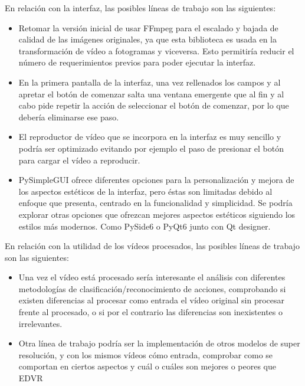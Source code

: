 En relación con la interfaz, las posibles líneas de trabajo son las siguientes:

\begin{itemize}
\item Retomar la versión inicial de usar FFmpeg para el escalado y bajada de calidad de las imágenes originales, ya que esta biblioteca es usada en la transformación de vídeo a fotogramas y viceversa. Esto permitiría reducir el número de requerimientos previos para poder ejecutar la interfaz. 

\item En la primera pantalla de la interfaz, una vez rellenados los campos y al apretar el botón de comenzar salta una ventana emergente que al fin y al cabo pide repetir la acción de seleccionar el botón de comenzar, por lo que debería eliminarse ese paso.

\item El reproductor de vídeo que se incorpora en la interfaz es muy sencillo y podría ser optimizado evitando por ejemplo el paso de presionar el botón para cargar el vídeo a reproducir.

\item PySimpleGUI ofrece diferentes opciones para la personalización y mejora de los aspectos estéticos de la interfaz, pero éstas son limitadas debido al enfoque que presenta, centrado en la funcionalidad y simplicidad. Se podría explorar otras opciones que ofrezcan mejores aspectos estéticos siguiendo los estilos más modernos. Como PySide6 o PyQt6 junto con Qt designer. 

\end{itemize}

En relación con la utilidad de los vídeos procesados, las posibles líneas de trabajo son las siguientes:

\begin{itemize}
\item Una vez el vídeo está procesado sería interesante el análisis con diferentes metodologías de clasificación/reconocimiento de acciones, comprobando si existen diferencias al procesar como entrada el vídeo original sin procesar frente al procesado, o si por el contrario las diferencias son inexistentes o irrelevantes.

\item Otra línea de trabajo podría ser la implementación de otros modelos de super resolución, y con los mismos vídeos cómo entrada, comprobar como se comportan en ciertos aspectos y cuál o cuáles son mejores o peores que EDVR

\end{itemize}